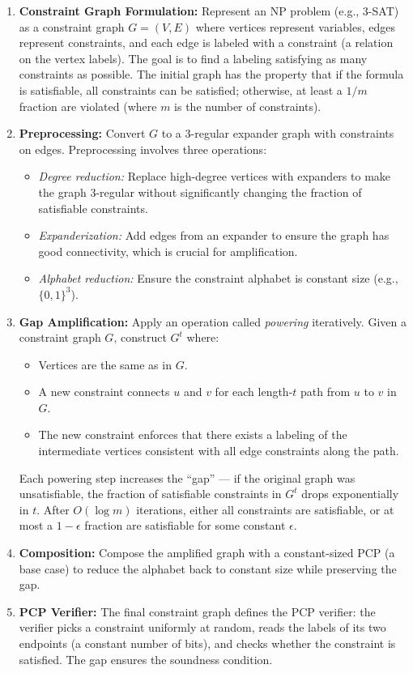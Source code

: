 \begin{enumerate}
\item \textbf{Constraint Graph Formulation:} Represent an NP problem (e.g., 3-SAT) as a constraint graph $G = (V,E)$ where vertices represent variables, edges represent constraints, and each edge is labeled with a constraint (a relation on the vertex labels). The goal is to find a labeling satisfying as many constraints as possible. The initial graph has the property that if the formula is satisfiable, all constraints can be satisfied; otherwise, at least a $1/m$ fraction are violated (where $m$ is the number of constraints).

\item \textbf{Preprocessing:} Convert $G$ to a 3-regular expander graph with constraints on edges. Preprocessing involves three operations:
\begin{itemize}
\item \emph{Degree reduction:} Replace high-degree vertices with expanders to make the graph 3-regular without significantly changing the fraction of satisfiable constraints.
\item \emph{Expanderization:} Add edges from an expander to ensure the graph has good connectivity, which is crucial for amplification.
\item \emph{Alphabet reduction:} Ensure the constraint alphabet is constant size (e.g., $\{0,1\}^3$).
\end{itemize}

\item \textbf{Gap Amplification:} Apply an operation called \emph{powering} iteratively. Given a constraint graph $G$, construct $G^t$ where:
\begin{itemize}
\item Vertices are the same as in $G$.
\item A new constraint connects $u$ and $v$ for each length-$t$ path from $u$ to $v$ in $G$.
\item The new constraint enforces that there exists a labeling of the intermediate vertices consistent with all edge constraints along the path.
\end{itemize}
Each powering step increases the ``gap'' — if the original graph was unsatisfiable, the fraction of satisfiable constraints in $G^t$ drops exponentially in $t$. After $O(\log m)$ iterations, either all constraints are satisfiable, or at most a $1-\epsilon$ fraction are satisfiable for some constant $\epsilon$.

\item \textbf{Composition:} Compose the amplified graph with a constant-sized PCP (a base case) to reduce the alphabet back to constant size while preserving the gap.

\item \textbf{PCP Verifier:} The final constraint graph defines the PCP verifier: the verifier picks a constraint uniformly at random, reads the labels of its two endpoints (a constant number of bits), and checks whether the constraint is satisfied. The gap ensures the soundness condition.
\end{enumerate}

